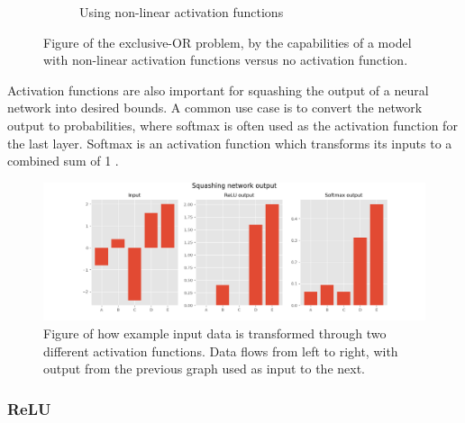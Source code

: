 \begin{figure}[H]
\begin{subfigure}{.45\textwidth}
        \caption{Using non-linear activation functions}%

    \end{subfigure}
    
    \caption{Figure of the exclusive-OR problem, by the capabilities of a model with non-linear activation functions versus no activation function.}
    \label{fig:exclusive-OR problem}
\end{figure}

Activation functions are also important for squashing the output of a neural network into desired bounds. A common use case is to convert the network output to probabilities, where softmax is often used as the activation function for the last layer. Softmax is an activation function which transforms its inputs to a combined sum of 1 \cite{sharma_understanding_2018}.

\begin{figure}[H]
  \centering
    \includegraphics[width=\textwidth]{Assets/Chapter2_Theory/squashin_output_data_using_activation_functions.png}
    \caption{Figure of how example input data is transformed through two different activation functions. Data flows from left to right, with output from the previous graph used as input to the next.}
\end{figure}

\subsubsection{ReLU}

